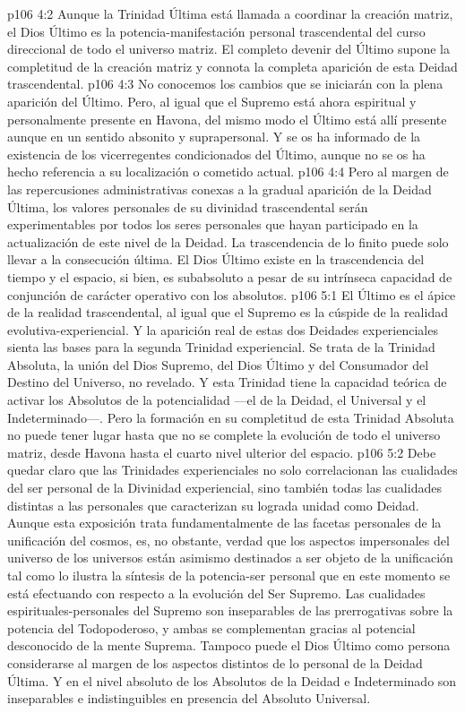 \vs p106 4:2 Aunque la Trinidad Última está llamada a coordinar la creación matriz, el Dios Último es la potencia\hyp{}manifestación personal trascendental del curso direccional de todo el universo matriz. El completo devenir del Último supone la completitud de la creación matriz y connota la completa aparición de esta Deidad trascendental.
\vs p106 4:3 No conocemos los cambios que se iniciarán con la plena aparición del Último. Pero, al igual que el Supremo está ahora espiritual y personalmente presente en Havona, del mismo modo el Último está allí presente aunque en un sentido absonito y suprapersonal. Y se os ha informado de la existencia de los vicerregentes condicionados del Último, aunque no se os ha hecho referencia a su localización o cometido actual.
\vs p106 4:4 Pero al margen de las repercusiones administrativas conexas a la gradual aparición de la Deidad Última, los valores personales de su divinidad trascendental serán experimentables por todos los seres personales que hayan participado en la actualización de este nivel de la Deidad. La trascendencia de lo finito puede solo llevar a la consecución última. El Dios Último existe en la trascendencia del tiempo y el espacio, si bien, es subabsoluto a pesar de su intrínseca capacidad de conjunción de carácter operativo con los absolutos.
\vs p106 5:1 El Último es el ápice de la realidad trascendental, al igual que el Supremo es la cúspide de la realidad evolutiva\hyp{}experiencial. Y la aparición real de estas dos Deidades experienciales sienta las bases para la segunda Trinidad experiencial. Se trata de la Trinidad Absoluta, la unión del Dios Supremo, del Dios Último y del Consumador del Destino del Universo, no revelado. Y esta Trinidad tiene la capacidad teórica de activar los Absolutos de la potencialidad ---el de la Deidad, el Universal y el Indeterminado---. Pero la formación en su completitud de esta Trinidad Absoluta no puede tener lugar hasta que no se complete la evolución de todo el universo matriz, desde Havona hasta el cuarto nivel ulterior del espacio.
\vs p106 5:2 Debe quedar claro que las Trinidades experienciales no solo correlacionan las cualidades del ser personal de la Divinidad experiencial, sino también todas las cualidades distintas a las personales que caracterizan su lograda unidad como Deidad. Aunque esta exposición trata fundamentalmente de las facetas personales de la unificación del cosmos, es, no obstante, verdad que los aspectos impersonales del universo de los universos están asimismo destinados a ser objeto de la unificación tal como lo ilustra la síntesis de la potencia\hyp{}ser personal que en este momento se está efectuando con respecto a la evolución del Ser Supremo. Las cualidades espirituales\hyp{}personales del Supremo son inseparables de las prerrogativas sobre la potencia del Todopoderoso, y ambas se complementan gracias al potencial desconocido de la mente Suprema. Tampoco puede el Dios Último como persona considerarse al margen de los aspectos distintos de lo personal de la Deidad Última. Y en el nivel absoluto de los Absolutos de la Deidad e Indeterminado son inseparables e indistinguibles en presencia del Absoluto Universal.
